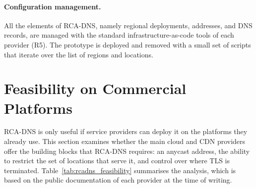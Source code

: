 \paragraph{Configuration management.} All the elements of RCA-DNS, namely regional deployments, addresses, and DNS records, are managed with the standard infrastructure-as-code tools of each provider (R5). The prototype is deployed and removed with a small set of scripts that iterate over the list of regions and locations.

\section{Feasibility on Commercial Platforms}
\label{sc:rcadns_feasibility}

RCA-DNS is only useful if service providers can deploy it on the platforms they already use. This section examines whether the main cloud and CDN providers offer the building blocks that RCA-DNS requires: an anycast address, the ability to restrict the set of locations that serve it, and control over where TLS is terminated. Table~\ref{tab:rcadns_feasibility} summarises the analysis, which is based on the public documentation of each provider at the time of writing.


